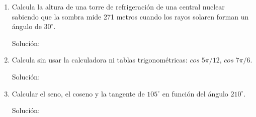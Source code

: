 \documentclass[11pt,letterpaper]{article}
\begin{document}
\begin{enumerate}
	\item Calcula la altura de una torre de refrigeración de una central nuclear sabiendo que la sombra mide 271 metros cuando los rayos solaren forman un ángulo de $30^\circ$.

	Solución:

	\item Calcula sin usar la calculadora ni tablas trigonométricas: $cos\;5\pi/12$, $cos\;7\pi/6$.

	Solución:

	\item Calcular el seno, el coseno y la tangente de $105^\circ$ en función del ángulo $210^\circ$. 

	Solución:

\end{enumerate}
\end{document}
